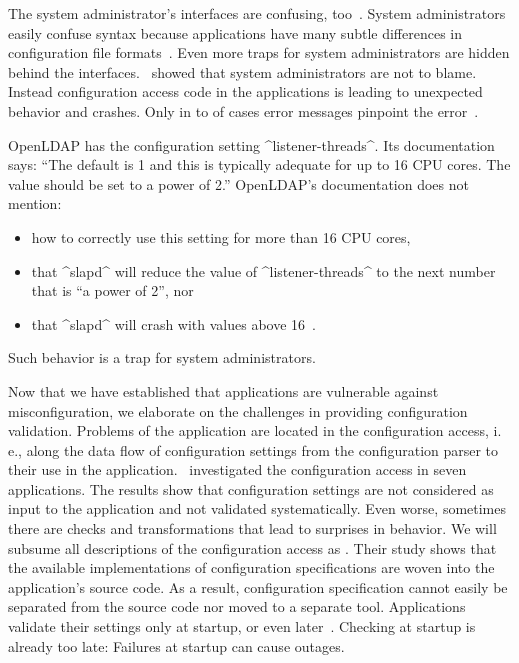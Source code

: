 The system administrator's interfaces are confusing, too~\cite{barrett2003system,barrett2004field}.
System administrators easily confuse syntax because applications have many subtle differences in configuration file formats~\cite{barrett2004field}.
Even more traps for system administrators are hidden behind the interfaces.
\citet{xu2013blame}~showed that system administrators are not to blame.
Instead configuration access code in the applications is leading to unexpected behavior and crashes.
Only in  to  of cases error messages pinpoint the error~\cite{yin2011empirical,raab2017challenges}.

\begin{example}
\label{ex:introduction-openldap-crash}
OpenLDAP has the configuration setting ^listener-threads^.
Its documentation says: \enquote{The default is 1 and this is typically adequate for up to 16 CPU cores. The value should be set to a power of 2.}
OpenLDAP's documentation does not mention:
\begin{itemize}
\item how to correctly use this setting for more than 16 CPU cores,
\item that ^slapd^ will reduce the value of ^listener-threads^ to the next number that is \enquote{a power of 2}, nor
\item that ^slapd^ will crash with values above 16~\cite{xu2013blame}.
\end{itemize}
Such behavior is a trap for system administrators.
\end{example}



Now that we have established that applications are vulnerable against misconfiguration, we elaborate on the challenges in providing configuration validation.
Problems of the application are located in the configuration access, i.\,e., along the data flow of configuration settings from the configuration parser to their use in the application.
\citet{xu2013blame}~investigated the configuration access in seven applications.
The results show that configuration settings are not considered as input to the application and not validated systematically.
Even worse, sometimes there are checks and transformations that lead to surprises in behavior.
We will subsume all descriptions of the configuration access as .
Their study shows that the available implementations of configuration specifications are woven into the application's source code.
As a result, configuration specification cannot easily be separated from the source code nor moved to a separate tool.
Applications validate their settings only at startup, or even later~\cite{xu2016early}.
Checking at startup is already too late:
Failures at startup can cause outages.

